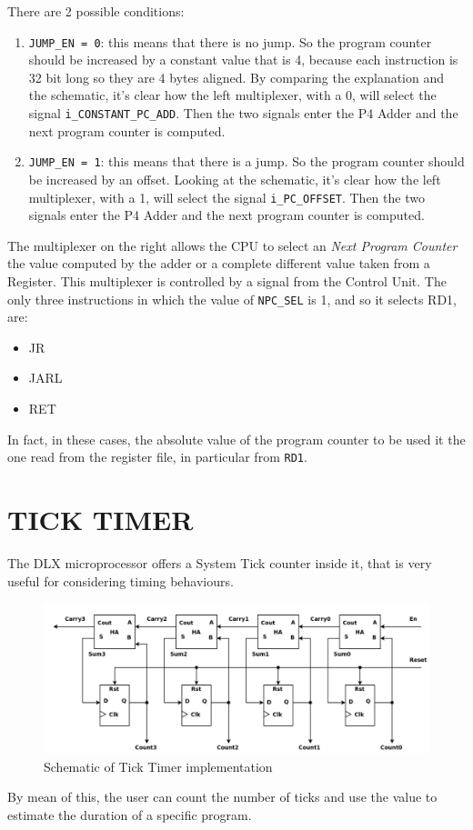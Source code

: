 There are 2 possible conditions:

\begin{enumerate}
  \item \texttt{JUMP\_EN = 0}: this means that there is no jump. So the program counter should be increased by a constant value that is 4, because each instruction is 32 bit long so they are 4 bytes aligned. By comparing the explanation and the schematic, it's clear how the left multiplexer, with a 0, will select the signal \texttt{i\_CONSTANT\_PC\_ADD}. Then the two signals enter the P4 Adder and the next program counter is computed.  
  \item \texttt{JUMP\_EN = 1}: this means that there is a jump. So the program counter should be increased by an offset. Looking at the schematic, it's clear how the left multiplexer, with a 1, will select the signal \texttt{i\_PC\_OFFSET}. Then the two signals enter the P4 Adder and the next program counter is computed. 
\end{enumerate}

The multiplexer on the right allows the CPU to select an \emph{Next Program Counter} the value computed by the adder or a complete different value taken from  a Register. This multiplexer is controlled by a signal from the Control Unit. The only three instructions in which the value of \texttt{NPC\_SEL} is 1, and so it selects RD1, are:

\begin{itemize}
  \item JR
  \item JARL
  \item RET
\end{itemize}

In fact, in these cases, the absolute value of the program counter to be used it the one read from the register file, in particular from \texttt{RD1}.

\newpage
\section{TICK TIMER}

The DLX microprocessor offers a System Tick counter inside it, that is very useful for considering timing behaviours.

\begin{figure}[H]
	\centering
	\includegraphics[width=1.0\textwidth]{chapters/4_DecodeStage/images/ha_counter.png}
	\caption{Schematic of Tick Timer implementation}
	\label{ticktmr_hacounter}
\end{figure}

By mean of this, the user can count the number of ticks and use the value to estimate the duration of a specific program. 
